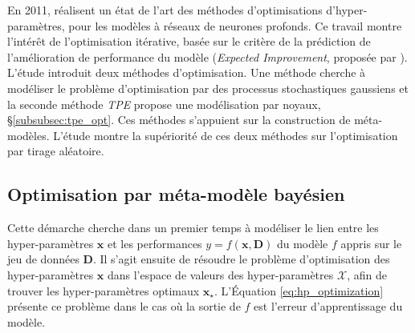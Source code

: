 
En 2011, \citeauthor{bergstra_algorithms_2011} \cite{bergstra_algorithms_2011} réalisent un état de l'art des méthodes d'optimisations d'hyper-paramètres, pour les modèles à réseaux de neurones profonds.
Ce travail montre l'intérêt de l'optimisation itérative, basée sur le critère de la prédiction de l'amélioration de performance du modèle (\textit{Expected Improvement}, proposée par \citeauthor{jones_taxonomy_2001} \cite{jones_taxonomy_2001}).
L'étude introduit deux méthodes d'optimisation.
Une méthode cherche à modéliser le problème d'optimisation par des processus stochastiques gaussiens et la seconde méthode \textit{TPE} propose une modélisation par noyaux, §\ref{subsubsec:tpe_opt}.
Ces méthodes s'appuient sur la construction de méta-modèles.
L'étude montre la supériorité de ces deux méthodes sur l'optimisation par tirage aléatoire.

\subsection{Optimisation par méta-modèle bayésien} \label{subsec:bayesian_opt}
%
% 

Cette démarche cherche dans un premier temps à modéliser le lien entre les hyper-paramètres $\boldsymbol{x}$ et les performances $y = f(\boldsymbol{x}, \boldsymbol{D})$ du modèle $f$ appris sur le jeu de données $\boldsymbol{D}$.
Il s'agit ensuite de résoudre le problème d'optimisation des hyper-paramètres $\boldsymbol{x}$ dans l'espace de valeurs des hyper-paramètres $\mathcal{X}$, afin de trouver les hyper-paramètres optimaux $\boldsymbol{x}_{\star}$.
L'Équation \ref{eq:hp_optimization} présente ce problème dans le cas où la sortie de $f$ est l'erreur d'apprentissage du modèle.

